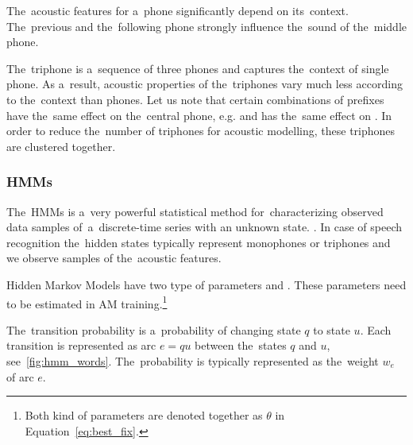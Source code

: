 The~acoustic features for a~phone significantly depend on its~context.
The~previous and the~following phone strongly influence the~sound of the~middle phone.

The~triphone is a~sequence of three phones and captures the~context of single phone.
As a~result, acoustic properties of the~triphones vary much less according to the~context than phones.
Let us note that certain combinations of prefixes have the~same effect on the~central phone,
e.g.  and  has the~same effect on . %
In order to reduce the~number of triphones for acoustic modelling, these triphones are clustered together.



%     
%     

\subsubsection*{\acfp{HMM}}
The~\acp{HMM} is a~very powerful statistical method for~characterizing observed data samples of~a~discrete-time series with an unknown state. \cite{huang2001spoken}. %
In case of speech recognition the~hidden states typically represent monophones or triphones and we observe samples of the~acoustic features.

Hidden Markov Models have two type of parameters  and .
These parameters need to be estimated in \ac{AM} training.\footnote{Both kind of parameters are denoted together as $\theta$ in Equation~\ref{eq:best_fix}.}

The~transition probability is a~probability of changing state $q$ to state $u$.
Each transition is represented as arc $e=qu$ between the~states $q$ and $u$, see~\ref{fig:hmm_words}.
The~probability is typically represented as the~weight $w_e$ of arc $e$.

